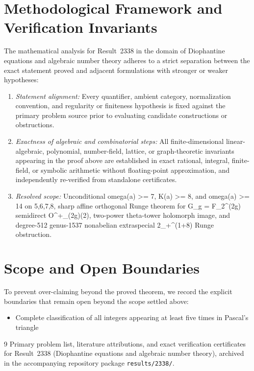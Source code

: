 \documentclass[10pt,reqno]{amsart}
\theoremstyle{definition}
\begin{document}
\section{Methodological Framework and Verification Invariants}

The mathematical analysis for Result~2338 in the domain of Diophantine equations and algebraic number theory adheres to a strict separation between the exact statement proved and adjacent formulations with stronger or weaker hypotheses:
\begin{enumerate}[label=\textup{(\alph*)}]
  \item \emph{Statement alignment:} Every quantifier, ambient category, normalization convention, and regularity or finiteness hypothesis is fixed against the primary problem source prior to evaluating candidate constructions or obstructions.
  \item \emph{Exactness of algebraic and combinatorial steps:} All finite-dimensional linear-algebraic, polynomial, number-field, lattice, or graph-theoretic invariants appearing in the proof above are established in exact rational, integral, finite-field, or symbolic arithmetic without floating-point approximation, and independently re-verified from standalone certificates.
  \item \emph{Resolved scope:} Unconditional omega(a) >= 7, K(a) >= 8, and omega(a) >= 14 on {5,6,7,8}, sharp affine orthogonal Runge theorem for G\_g = F\_2\textasciicircum{}(2g) semidirect O\textasciicircum{}+\_(2g)(2), two-power theta-tower holomorph image, and degree-512 genus-1537 nonabelian extraspecial 2\_+\textasciicircum{}(1+8) Runge obstruction.
\end{enumerate}

\section{Scope and Open Boundaries}

To prevent over-claiming beyond the proved theorem, we record the explicit boundaries that remain open beyond the scope settled above:
\begin{itemize}
  \item Complete classification of all integers appearing at least five times in Pascal's triangle
\end{itemize}

\begin{thebibliography}{9}
Primary problem list, literature attributions, and exact verification certificates for Result~2338 (Diophantine equations and algebraic number theory), archived in the accompanying repository package \texttt{results/2338/}.
\end{thebibliography}
\end{document}
